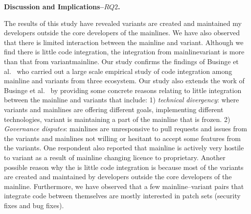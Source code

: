 \nd \textbf{Discussion and Implications--$RQ2$.}

The results of this study have revealed variants are created and maintained my developers outside the core developers of the mainlines.
We have also observed that there is limited interaction between the mainline and variant.
Although we find there is little code integration, the integration from mainline\ra variant is more than that from variant\ra mainline.
Our study confirms the findings of Businge et al.~\cite{businge:emse:2021} who carried out a large scale empirical study of code integration among mainline and variants from three ecosystem. Our study also extends the work of Businge et al.~\cite{businge:emse:2021} by providing some concrete reasons relating to little integration between the mainline and variants that include: 1) \textit{technical divergency}: where variants and mainlines are offering different goals, implementing different technologies, variant is maintaining a part of the mainline that is frozen. 2) \textit{Governance disputes}: mainlines are unresponsive to pull requests and issues from the variants and  mainlines not willing or hesitant to accept some features from the variants. One respondent also reported that mainline is actively very hostile to variant as a result of mainline changing licence to proprietary.
Another possible reason why the is little code integration is because most of the variants are created and maintained by developers outside the core developers of the mainline.
Furthermore, we have observed that a few mainline--variant pairs that integrate code between themselves are mostly interested in patch sets (security fixes and bug fixes).

